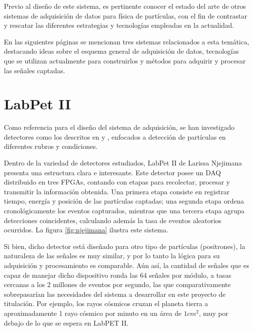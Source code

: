Previo al diseño de este sistema, es pertinente conocer el estado del arte de otros sistemas de adquisición de datos para física de partículas, con el fin de contrastar y rescatar las diferentes estrategias y tecnologías empleadas en la actualidad.

En las siguientes páginas se mencionan tres sistemas relacionados a esta temática, destacando ideas sobre el esquema general de adquisición de datos, tecnologías que se utilizan actualmente para construirlos y  métodos para adquirir y procesar las señales captadas.

\section{LabPet II}

	Como referencia para el diseño del sistema de adquisición, se han investigado detectores como los descritos en \cite{Basiladze2017Methods1} y \cite{Basiladze2017Methods2}, enfocados a detección de partículas en diferentes rubros y condiciones.
	
	Dentro de la variedad de detectores estudiados, LabPet II de Larissa Njejimana \cite{Njejimana2013DesignImaging} presenta una estructura clara e interesante. Este detector posee un DAQ distribuido en tres FPGAs, contando con etapas para recolectar, procesar y transmitir la información obtenida. Una primera etapa consiste en registrar tiempo, energía y posición de las partículas captadas; una segunda etapa ordena cronológicamente los eventos capturados, mientras que una tercera etapa agrupa detecciones coincidentes, calculando además la tasa de eventos aleatorios ocurridos. La figura \ref{fig:njejimana} ilustra este sistema.
	
	Si bien, dicho detector está diseñado para otro tipo de partículas (positrones), la naturaleza de las señales es muy similar, y por lo tanto la lógica para su adquisición y procesamiento es comparable. Aún así, la cantidad de señales que es capaz de manejar dicho dispositivo ronda las 64 señales por módulo, a tasas cercanas a los 2 millones de eventos por segundo, las que comparativamente sobrepasarían las necesidades del sistema a desarrollar en este proyecto de titulación. Por ejemplo, los rayos cósmicos cruzan el planeta tierra a aproximadamente 1 rayo cósmico por minuto en un área de $1cm^2$, muy por debajo de lo que se espera en LabPET II.
	
